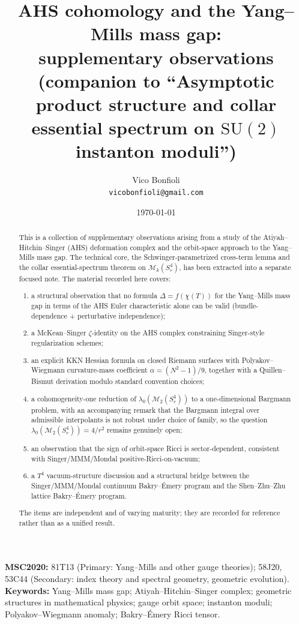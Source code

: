 \documentclass[11pt,letterpaper]{article}
\title{AHS cohomology and the Yang--Mills mass gap:\\supplementary observations\\[0.5em]
\large {\normalfont (companion to ``Asymptotic product structure and collar essential spectrum on $\mathrm{SU}(2)$ instanton moduli'')}}
\author{Vico Bonfioli\\\small \texttt{vicobonfioli@gmail.com}}
\date{\today}
\theoremstyle{definition}
\newcommand{\cM}{\mathcal{M}}
\begin{document}
\maketitle

\noindent\textbf{MSC2020:} 81T13 (Primary: Yang--Mills and other gauge theories); 58J20, 53C44 (Secondary: index theory and spectral geometry, geometric evolution).\\
\textbf{Keywords:} Yang--Mills mass gap; Atiyah--Hitchin--Singer complex; geometric structures in mathematical physics; gauge orbit space; instanton moduli; Polyakov--Wiegmann anomaly; Bakry--\'Emery Ricci tensor.

\medskip
\begin{abstract}
\noindent This is a collection of supplementary observations arising from a study of the Atiyah--Hitchin--Singer (AHS) deformation complex and the orbit-space approach to the Yang--Mills mass gap. The technical core, the Schwinger-parametrized cross-term lemma and the collar essential-spectrum theorem on $\cM_k(S^4_r)$, has been extracted into a separate focused note. The material recorded here covers:
\begin{enumerate}[label=(\arabic*),leftmargin=2em]
\item a structural observation that no formula $\Delta = f(\chi(T))$ for the Yang--Mills mass gap in terms of the AHS Euler characteristic alone can be valid (bundle-dependence + perturbative independence);
\item a McKean--Singer $\zeta$-identity on the AHS complex constraining Singer-style regularization schemes;
\item an explicit KKN Hessian formula on closed Riemann surfaces with Polyakov--Wiegmann curvature-mass coefficient $\alpha = (N^2-1)/9$, together with a Quillen--Bismut derivation modulo standard convention choices;
\item a cohomogeneity-one reduction of $\lambda_0(\cM_2(S^4_r))$ to a one-dimensional Bargmann problem, with an accompanying remark that the Bargmann integral over admissible interpolants is not robust under choice of family, so the question $\lambda_0(\cM_2(S^4_r)) = 4/r^2$ remains genuinely open;
\item an observation that the sign of orbit-space Ricci is sector-dependent, consistent with Singer/MMM/Mondal positive-Ricci-on-vacuum;
\item a $T^4$ vacuum-structure discussion and a structural bridge between the Singer/MMM/Mondal continuum Bakry--\'Emery program and the Shen--Zhu--Zhu lattice Bakry--\'Emery program.
\end{enumerate}
The items are independent and of varying maturity; they are recorded for reference rather than as a unified result.
\end{abstract}
\end{document}
